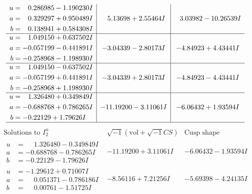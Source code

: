 \documentclass[1p]{elsarticle_modified}
\theoremstyle{definition}
\newcommand{\I}{\sqrt{-1}}
\begin{document}
$$\begin{array}{c|c|c}
\begin{aligned}
u &= \phantom{-}0.286985 - 1.190230 I \\
a &= \phantom{-}0.329297 + 0.950489 I \\
b &= \phantom{-}0.138941 + 0.584308 I\end{aligned}
 & \phantom{-}5.13698 + 2.55464 I & \phantom{-}3.03982 - 10.26539 I \\ \hline\begin{aligned}
u &= \phantom{-}1.049150 + 0.637502 I \\
a &= -0.057199 - 0.441891 I \\
b &= -0.258968 - 1.198930 I\end{aligned}
 & -3.04339 - 2.80173 I & -4.84923 + 4.43441 I \\ \hline\begin{aligned}
u &= \phantom{-}1.049150 - 0.637502 I \\
a &= -0.057199 + 0.441891 I \\
b &= -0.258968 + 1.198930 I\end{aligned}
 & -3.04339 + 2.80173 I & -4.84923 - 4.43441 I \\ \hline\begin{aligned}
u &= \phantom{-}1.326480 + 0.349849 I \\
a &= -0.688768 + 0.786265 I \\
b &= -0.22129 + 1.79626 I\end{aligned}
 & -11.19200 - 3.11061 I & -6.06432 + 1.93594 I\\
 \hline 
 \end{array}$$\newpage$$\begin{array}{c|c|c}  
\text{Solutions to }I^u_{2}& \I (\text{vol} + \sqrt{-1}CS) & \text{Cusp shape}\\
 \hline 
\begin{aligned}
u &= \phantom{-}1.326480 - 0.349849 I \\
a &= -0.688768 - 0.786265 I \\
b &= -0.22129 - 1.79626 I\end{aligned}
 & -11.19200 + 3.11061 I & -6.06432 - 1.93594 I \\ \hline\begin{aligned}
u &= -1.29612 + 0.71007 I \\
a &= \phantom{-}0.051371 - 0.786186 I \\
b &= \phantom{-}0.00761 - 1.51725 I\end{aligned}
 & -8.56116 + 7.21256 I & -5.69398 - 4.24135 I \\ \hline\begin{aligned}

\end{aligned}
\end{array}$$
\end{document}
